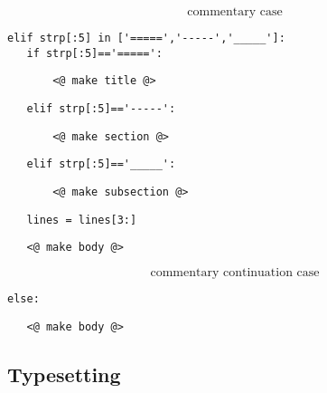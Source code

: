 \documentclass{article}
\begin{document}
$$\boxed{\text{commentary case}}$${\color{YellowOrange}\begin{verbatim}elif strp[:5] in ['=====','-----','_____']:
   if strp[:5]=='=====':
\end{verbatim}}{\color{MidnightBlue}\begin{verbatim}       <@ make title @>
\end{verbatim}}{\color{YellowOrange}\begin{verbatim}   elif strp[:5]=='-----':
\end{verbatim}}{\color{MidnightBlue}\begin{verbatim}       <@ make section @>
\end{verbatim}}{\color{YellowOrange}\begin{verbatim}   elif strp[:5]=='_____':
\end{verbatim}}{\color{MidnightBlue}\begin{verbatim}       <@ make subsection @>
\end{verbatim}}{\color{YellowOrange}\begin{verbatim}   lines = lines[3:]
\end{verbatim}}{\color{MidnightBlue}\begin{verbatim}   <@ make body @>
\end{verbatim}}$$\boxed{\text{commentary continuation case}}$${\color{YellowOrange}\begin{verbatim}else:
\end{verbatim}}{\color{MidnightBlue}\begin{verbatim}   <@ make body @>
\end{verbatim}}\subsection{Typesetting}
\end{document}
